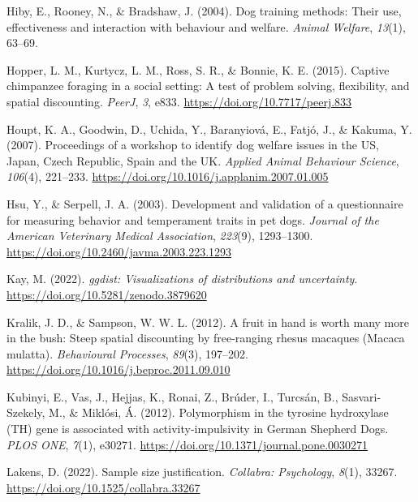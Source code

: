 \documentclass[
  pub,floatsintext]{apa6}
\newlength{\cslhangindent}
\newlength{\cslentryspacingunit} %
\newenvironment{CSLReferences}[2] %
 {%
  \setlength{\parindent}{0pt}
  \ifodd #1
  \let\oldpar\par
  \def\par{\hangindent=\cslhangindent\oldpar}
  \fi
  \setlength{\parskip}{#2\cslentryspacingunit}
 }%
 {}
\begin{document}
\begin{CSLReferences}{1}{0}
\leavevmode{}%
Hiby, E., Rooney, N., \& Bradshaw, J. (2004). Dog training methods: Their use, effectiveness and interaction with behaviour and welfare. \emph{Animal Welfare}, \emph{13}(1), 63--69.

\leavevmode{}%
Hopper, L. M., Kurtycz, L. M., Ross, S. R., \& Bonnie, K. E. (2015). Captive chimpanzee foraging in a social setting: A test of problem solving, flexibility, and spatial discounting. \emph{PeerJ}, \emph{3}, e833. \url{https://doi.org/10.7717/peerj.833}

\leavevmode{}%
Houpt, K. A., Goodwin, D., Uchida, Y., Baranyiová, E., Fatjó, J., \& Kakuma, Y. (2007). Proceedings of a workshop to identify dog welfare issues in the {US}, {Japan}, {Czech Republic}, {Spain} and the {UK}. \emph{Applied Animal Behaviour Science}, \emph{106}(4), 221--233. \url{https://doi.org/10.1016/j.applanim.2007.01.005}

\leavevmode{}%
Hsu, Y., \& Serpell, J. A. (2003). Development and validation of a questionnaire for measuring behavior and temperament traits in pet dogs. \emph{Journal of the American Veterinary Medical Association}, \emph{223}(9), 1293--1300. \url{https://doi.org/10.2460/javma.2003.223.1293}

\leavevmode{}%
Kay, M. (2022). \emph{{ggdist}: Visualizations of distributions and uncertainty}. \url{https://doi.org/10.5281/zenodo.3879620}

\leavevmode{}%
Kralik, J. D., \& Sampson, W. W. L. (2012). A fruit in hand is worth many more in the bush: Steep spatial discounting by free-ranging rhesus macaques ({Macaca} mulatta). \emph{Behavioural Processes}, \emph{89}(3), 197--202. \url{https://doi.org/10.1016/j.beproc.2011.09.010}

\leavevmode{}%
Kubinyi, E., Vas, J., Hejjas, K., Ronai, Z., Brúder, I., Turcsán, B., Sasvari-Szekely, M., \& Miklósi, Á. (2012). Polymorphism in the tyrosine hydroxylase ({TH}) gene is associated with activity-impulsivity in {German Shepherd Dogs}. \emph{PLOS ONE}, \emph{7}(1), e30271. \url{https://doi.org/10.1371/journal.pone.0030271}

\leavevmode{}%
Lakens, D. (2022). Sample size justification. \emph{Collabra: Psychology}, \emph{8}(1), 33267. \url{https://doi.org/10.1525/collabra.33267}


\end{CSLReferences}
\end{document}
